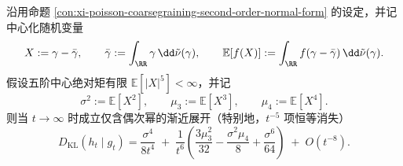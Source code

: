 \begin{theorem}\label{thm:xi-cauchy-poisson-kl-sharp-asymptotics}
沿用命题 \ref{con:xi-poisson-coarsegraining-second-order-normal-form} 的设定，并记中心化随机变量
\[
X:=\gamma-\bar\gamma,
\qquad
\bar\gamma:=\int_{\RR}\gamma\,\dd\tilde\nu(\gamma),
\qquad
\mathbb{E}[f(X)]:=\int_{\RR}f(\gamma-\bar\gamma)\,\dd\tilde\nu(\gamma).
\]
假设五阶中心绝对矩有限 \(\mathbb{E}[|X|^5]<\infty\)，并记
\[
\sigma^2:=\mathbb{E}[X^2],\qquad
\mu_3:=\mathbb{E}[X^3],\qquad
\mu_4:=\mathbb{E}[X^4].
\]
则当 \(t\to\infty\) 时成立仅含偶次幂的渐近展开（特别地，\(t^{-5}\) 项恒等消失）
\begin{equation}\label{eq:xi-cauchy-poisson-kl-sharp-asymptotics}
\boxed{\;
D_{\mathrm{KL}}(h_t\mid g_t)
=\frac{\sigma^4}{8t^4}
\;+\;\frac{1}{t^6}\left(
\frac{3\mu_3^2}{32}
-\frac{\sigma^2\mu_4}{8}
+\frac{\sigma^6}{64}
\right)
\;+\;O(t^{-8}).\;}
\end{equation}
\end{theorem}

